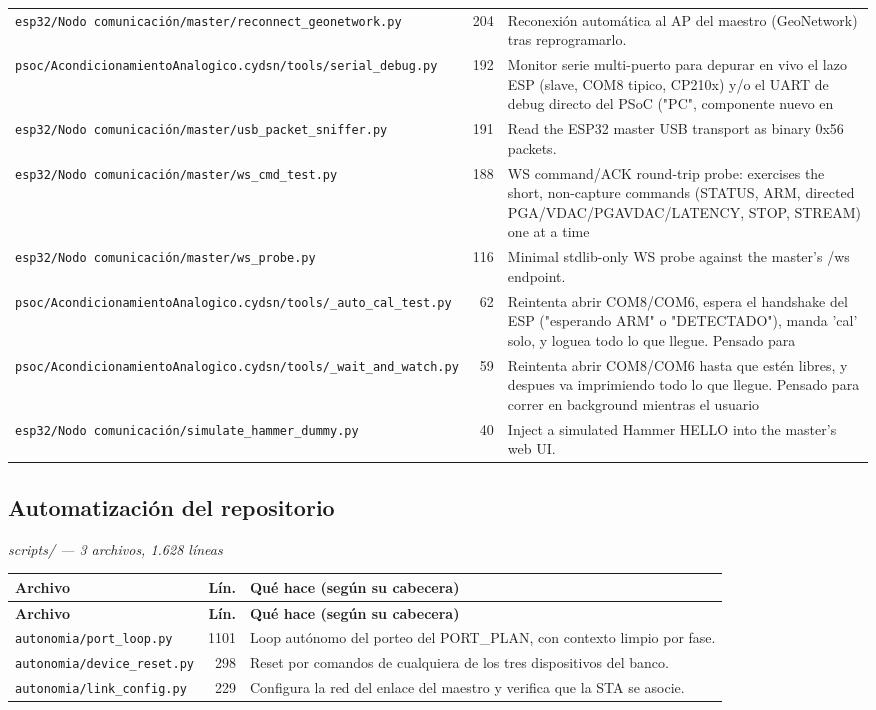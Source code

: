 \begin{longtable}{@{}p{5.4cm} r p{8.6cm}@{}}
\texttt{\scriptsize esp32/Nodo comunicación/master/reconnect\_geonetwork.py} & 204 & Reconexión automática al AP del maestro (GeoNetwork) tras reprogramarlo. \\
\texttt{\scriptsize psoc/AcondicionamientoAnalogico.cydsn/tools/serial\_debug.py} & 192 & Monitor serie multi-puerto para depurar en vivo el lazo ESP (slave, COM8 tipico, CP210x) y/o el UART de debug directo del PSoC ("PC", componente nuevo en \\
\texttt{\scriptsize esp32/Nodo comunicación/master/usb\_packet\_sniffer.py} & 191 & Read the ESP32 master USB transport as binary 0x56 packets. \\
\texttt{\scriptsize esp32/Nodo comunicación/master/ws\_cmd\_test.py} & 188 & WS command/ACK round-trip probe: exercises the short, non-capture commands (STATUS, ARM, directed PGA/VDAC/PGAVDAC/LATENCY, STOP, STREAM) one at a time \\
\texttt{\scriptsize esp32/Nodo comunicación/master/ws\_probe.py} & 116 & Minimal stdlib-only WS probe against the master's /ws endpoint. \\
\texttt{\scriptsize psoc/AcondicionamientoAnalogico.cydsn/tools/\_auto\_cal\_test.py} & 62 & Reintenta abrir COM8/COM6, espera el handshake del ESP ("esperando ARM" o "DETECTADO"), manda 'cal' solo, y loguea todo lo que llegue. Pensado para \\
\texttt{\scriptsize psoc/AcondicionamientoAnalogico.cydsn/tools/\_wait\_and\_watch.py} & 59 & Reintenta abrir COM8/COM6 hasta que estén libres, y despues va imprimiendo todo lo que llegue. Pensado para correr en background mientras el usuario \\
\texttt{\scriptsize esp32/Nodo comunicación/simulate\_hammer\_dummy.py} & 40 & Inject a simulated Hammer HELLO into the master's web UI. \\
\end{longtable}
\normalsize

\subsection{Automatizaci\'on del repositorio}
\textit{\small scripts/ --- 3 archivos, 1.628 l\'ineas}
\footnotesize
\begin{longtable}{@{}p{5.4cm} r p{8.6cm}@{}}
\toprule \textbf{Archivo} & \textbf{L\'in.} & \textbf{Qu\'e hace (seg\'un su cabecera)} \\ \midrule
\endfirsthead
\toprule \textbf{Archivo} & \textbf{L\'in.} & \textbf{Qu\'e hace (seg\'un su cabecera)} \\ \midrule
\endhead
\bottomrule \endfoot
\texttt{\scriptsize autonomia/port\_loop.py} & 1101 & Loop autónomo del porteo del PORT\_PLAN, con contexto limpio por fase. \\
\texttt{\scriptsize autonomia/device\_reset.py} & 298 & Reset por comandos de cualquiera de los tres dispositivos del banco. \\
\texttt{\scriptsize autonomia/link\_config.py} & 229 & Configura la red del enlace del maestro y verifica que la STA se asocie. \\
\end{longtable}
\normalsize

